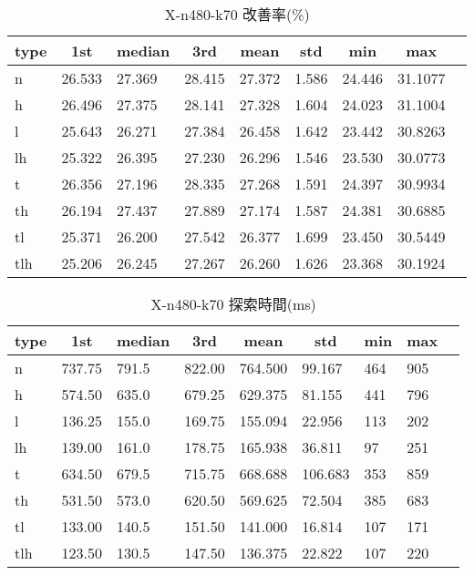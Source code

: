 \begin{table}[htbp]
    \caption{X-n480-k70 改善率(\%)}
    \begin{tabular}{|l|l|l|l|l|l|l|l|l|}\hline
    \multicolumn{1}{|c|}{\textbf{type}}
    &\multicolumn{1}{|c|}{\textbf{1st}}
    &\multicolumn{1}{c|}{\textbf{median}}
    &\multicolumn{1}{c|}{\textbf{3rd}}
    &\multicolumn{1}{c|}{\textbf{mean}}
    &\multicolumn{1}{c|}{\textbf{std}}
    &\multicolumn{1}{c|}{\textbf{min}}
    &\multicolumn{1}{c|}{\textbf{max}}\\\hline
	n & 26.533 & 27.369 & 28.415 & 27.372 & 1.586 & 24.446 & 31.1077\\\hline
	h & 26.496 & 27.375 & 28.141 & 27.328 & 1.604 & 24.023 & 31.1004\\\hline
	l & 25.643 & 26.271 & 27.384 & 26.458 & 1.642 & 23.442 & 30.8263\\\hline
	lh & 25.322 & 26.395 & 27.230 & 26.296 & 1.546 & 23.530 & 30.0773\\\hline
	t & 26.356 & 27.196 & 28.335 & 27.268 & 1.591 & 24.397 & 30.9934\\\hline
	th & 26.194 & 27.437 & 27.889 & 27.174 & 1.587 & 24.381 & 30.6885\\\hline
	tl & 25.371 & 26.200 & 27.542 & 26.377 & 1.699 & 23.450 & 30.5449\\\hline
	tlh & 25.206 & 26.245 & 27.267 & 26.260 & 1.626 & 23.368 & 30.1924\\\hline
	\end{tabular}
\end{table}
\begin{table}[htbp]
    \caption{X-n480-k70 探索時間(ms)}
    \begin{tabular}{|l|l|l|l|l|l|l|l|l|}\hline
    \multicolumn{1}{|c|}{\textbf{type}}
    &\multicolumn{1}{|c|}{\textbf{1st}}
    &\multicolumn{1}{c|}{\textbf{median}}
    &\multicolumn{1}{c|}{\textbf{3rd}}
    &\multicolumn{1}{c|}{\textbf{mean}}
    &\multicolumn{1}{c|}{\textbf{std}}
    &\multicolumn{1}{c|}{\textbf{min}}
    &\multicolumn{1}{c|}{\textbf{max}}\\\hline
	n & 737.75 & 791.5 & 822.00 & 764.500 & 99.167 & 464 & 905\\\hline
	h & 574.50 & 635.0 & 679.25 & 629.375 & 81.155 & 441 & 796\\\hline
	l & 136.25 & 155.0 & 169.75 & 155.094 & 22.956 & 113 & 202\\\hline
	lh & 139.00 & 161.0 & 178.75 & 165.938 & 36.811 & 97 & 251\\\hline
	t & 634.50 & 679.5 & 715.75 & 668.688 & 106.683 & 353 & 859\\\hline
	th & 531.50 & 573.0 & 620.50 & 569.625 & 72.504 & 385 & 683\\\hline
	tl & 133.00 & 140.5 & 151.50 & 141.000 & 16.814 & 107 & 171\\\hline
	tlh & 123.50 & 130.5 & 147.50 & 136.375 & 22.822 & 107 & 220\\\hline
	\end{tabular}
\end{table}
